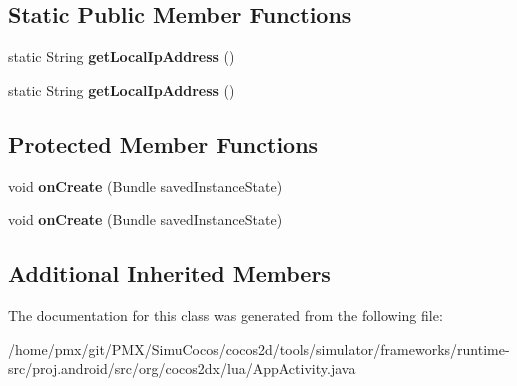 \subsection*{Static Public Member Functions}
\begin{DoxyCompactItemize}
\item 
\mbox{\label{classorg_1_1cocos2dx_1_1lua_1_1AppActivity_a077d338f7c8b5c4b70b2ba93cc8e8373}} 
static String {\bfseries get\+Local\+Ip\+Address} ()
\item 
\mbox{\label{classorg_1_1cocos2dx_1_1lua_1_1AppActivity_a077d338f7c8b5c4b70b2ba93cc8e8373}} 
static String {\bfseries get\+Local\+Ip\+Address} ()
\end{DoxyCompactItemize}
\subsection*{Protected Member Functions}
\begin{DoxyCompactItemize}
\item 
\mbox{\label{classorg_1_1cocos2dx_1_1lua_1_1AppActivity_afb323d7270170b878c2e1ebfba49489c}} 
void {\bfseries on\+Create} (Bundle saved\+Instance\+State)
\item 
\mbox{\label{classorg_1_1cocos2dx_1_1lua_1_1AppActivity_afb323d7270170b878c2e1ebfba49489c}} 
void {\bfseries on\+Create} (Bundle saved\+Instance\+State)
\end{DoxyCompactItemize}
\subsection*{Additional Inherited Members}


The documentation for this class was generated from the following file\+:\begin{DoxyCompactItemize}
\item 
/home/pmx/git/\+P\+M\+X/\+Simu\+Cocos/cocos2d/tools/simulator/frameworks/runtime-\/src/proj.\+android/src/org/cocos2dx/lua/App\+Activity.\+java\end{DoxyCompactItemize}
